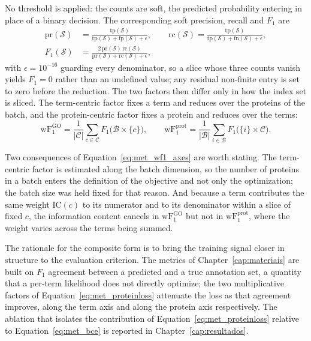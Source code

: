 \documentclass[Ingles]{ic-tese-v3}
\begin{document}
No threshold is applied: the counts are soft, the predicted probability entering in place of a
binary
decision. The corresponding soft precision, recall and $F_1$ are
\begin{equation}
  \begin{aligned}
    \mathrm{pr}(\mathcal{S}) &= \frac{\mathrm{tp}(\mathcal{S})}{\mathrm{tp}(\mathcal{S}) + \mathrm{fp}(\mathcal{S}) + \epsilon},
    \qquad
    \mathrm{rc}(\mathcal{S}) = \frac{\mathrm{tp}(\mathcal{S})}{\mathrm{tp}(\mathcal{S}) + \mathrm{fn}(\mathcal{S}) + \epsilon}, \\[4pt]
    F_1(\mathcal{S}) &= \frac{2\, \mathrm{pr}(\mathcal{S})\, \mathrm{rc}(\mathcal{S})}{\mathrm{pr}(\mathcal{S}) + \mathrm{rc}(\mathcal{S}) + \epsilon},
  \end{aligned}
  \label{eq:met_softf1}
\end{equation}
\noindent with $\epsilon = 10^{-16}$ guarding every denominator, so a slice whose three counts vanish yields
$F_1 = 0$ rather than an undefined value; any residual non-finite entry is set to zero before the
reduction. The two factors then differ only in how the index set is sliced. The term-centric factor
fixes a term and reduces over the proteins of the batch, and the protein-centric factor fixes a
protein and reduces over the terms:
\begin{equation}
  \mathrm{wF}_1^{\text{GO}} = \frac{1}{|\mathcal{C}|} \sum_{c \in \mathcal{C}} F_1\bigl(\mathcal{B} \times \{c\}\bigr),
  \qquad
  \mathrm{wF}_1^{\text{prot}} = \frac{1}{|\mathcal{B}|} \sum_{i \in \mathcal{B}} F_1\bigl(\{i\} \times \mathcal{C}\bigr).
  \label{eq:met_wf1_axes}
\end{equation}

Two consequences of Equation~\eqref{eq:met_wf1_axes} are worth stating. The term-centric factor is
estimated along the batch dimension, so the number of proteins in a batch enters the definition of
the objective and not only the optimization; the batch size was held fixed for that reason. And
because a term contributes the same weight $\mathrm{IC}(c)$ to its numerator and to its denominator
within a slice of fixed $c$, the information content cancels in $\mathrm{wF}_1^{\text{GO}}$ but not
in $\mathrm{wF}_1^{\text{prot}}$, where the weight varies across the terms being summed.

The rationale for the composite form is to bring the training signal closer in structure to the
evaluation criterion. The metrics of Chapter~\ref{cap:materiais} are built on $F_1$ agreement
between
a predicted and a true annotation set, a quantity that a per-term likelihood does not directly
optimize; the two multiplicative factors of Equation~\eqref{eq:met_proteinloss} attenuate the loss
as
that agreement improves, along the term axis and along the protein axis respectively. The ablation
that isolates the contribution of Equation~\eqref{eq:met_proteinloss} relative to
Equation~\eqref{eq:met_bce} is reported in Chapter~\ref{cap:resultados}.
\end{document}
